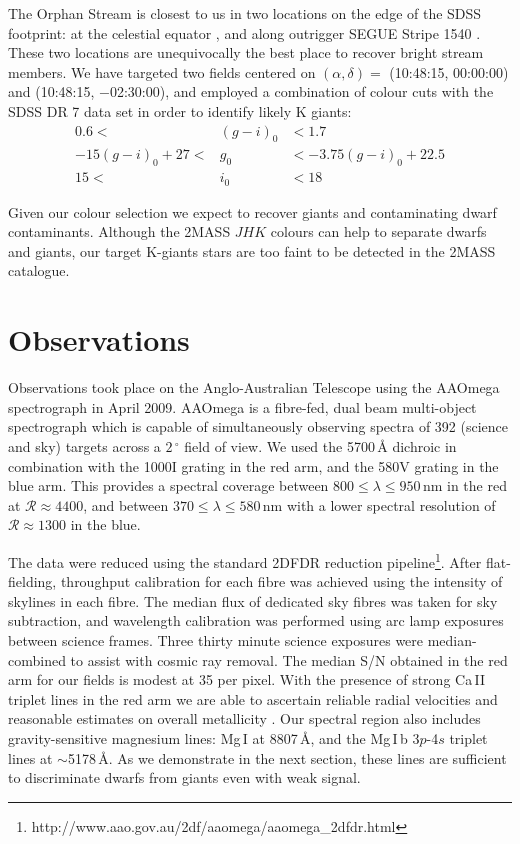 \documentclass[10pt,apjl]{emulateapj}
\begin{document}
The Orphan Stream is closest to us in two locations on the edge of the SDSS footprint: at the celestial equator \citep{Belokurov_et-al_2007}, and along outrigger SEGUE Stripe 1540 \citep{Newberg_et-al_2010}. These two locations are unequivocally the best place to recover bright stream members. We have targeted two fields centered on $(\alpha, \delta) =$ (10:48:15, 00:00:00) and (10:48:15, $-$02:30:00), and employed a combination of colour cuts with the SDSS DR 7 \citep{Abazajian_et-al_2009} data set in order to identify likely K giants:
\begin{eqnarray}
0.6 <& (g-i)_0 &< 1.7 \\
-15(g-i)_0 + 27 <& g_0 &< -3.75(g-i)_0 + 22.5 \\
15  <& i_0  &< 18 
\end{eqnarray}

Given our colour selection we expect to recover giants and contaminating dwarf contaminants. Although the 2MASS $JHK$ colours can help to separate dwarfs and giants, our target K-giants stars are too faint to be detected in the 2MASS catalogue.

\section{Observations}
\label{sec:observations}

Observations took place on the Anglo-Australian Telescope using the AAOmega spectrograph in April 2009. AAOmega is a fibre-fed, dual beam multi-object spectrograph which is capable of simultaneously observing spectra of 392 (science and sky) targets across a $2\,^\circ$ field of view. We used the 5700\,{\AA} dichroic in combination with the 1000I grating in the red arm, and the 580V grating in the blue arm. This provides a spectral coverage between $800 \leq \lambda \leq 950$\,nm in the red at $\mathcal{R} \approx 4400$, and between $370 \leq \lambda \leq 580$\,nm with a lower spectral resolution of $\mathcal{R} \approx 1300$ in the blue.

The data were reduced using the standard \textsc{2DFDR} reduction pipeline\footnote{http://www.aao.gov.au/2df/aaomega/aaomega\_2dfdr.html}. After flat-fielding, throughput calibration for each fibre was achieved using the intensity of skylines in each fibre. The median flux of dedicated sky fibres was taken for sky subtraction, and wavelength calibration was performed using arc lamp exposures between science frames. Three thirty minute science exposures were median-combined to assist with cosmic ray removal. The median S/N obtained in the red arm for our fields is modest at 35 per pixel. With the presence of strong Ca\,\textsc{II} triplet lines in the red arm we are able to ascertain reliable radial velocities and reasonable estimates on overall metallicity \citep[][and references therein]{Starkenburg_et-al_2010}. Our spectral region also includes gravity-sensitive magnesium lines: Mg\,\textsc{I} at 8807\,{\AA}, and the Mg\,\textsc{I}\,b 3$p$-4$s$ triplet lines at $\sim$5178\,{\AA}. As we demonstrate in the next section, these lines are sufficient to discriminate dwarfs from giants even with weak signal.
\end{document}
